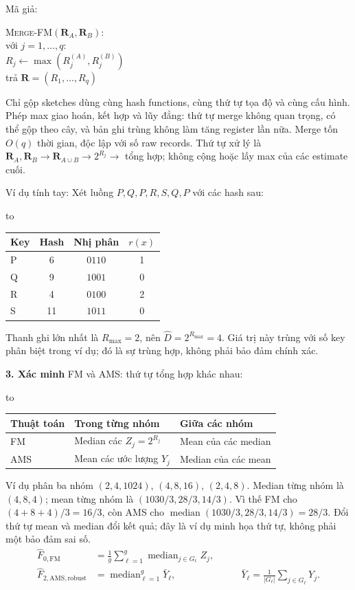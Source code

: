 \documentclass[10pt,a4paper,twocolumn]{article}
\makeatletter
\newcommand{\key}[1]{#1:\enspace}
\newenvironment{examtable}[1]{%
  \par\addvspace{2pt}\noindent\hbox to \linewidth\bgroup\hfil
  \setlength{\tabcolsep}{4pt}%
  \renewcommand{\arraystretch}{1.12}\begin{tabular}{#1}%
}{\end{tabular}\hfil\egroup\par\addvspace{2pt}}
\newcommand{\unitheading}[2]{%
  \par\addvspace{1pt}\noindent\textbf{#1. #2}\enspace}
\newcommand{\unitverification}{\unitheading{3}{Xác minh}}
\newenvironment{algpseudo}{%
  \par\addvspace{2pt}\noindent
  \setlength{\parskip}{0pt}%
  Mã giả:\par\nobreak
  \begin{list}{}{\setlength{\leftmargin}{1em}\setlength{\topsep}{0pt}%
    \setlength{\partopsep}{0pt}\setlength{\parsep}{0pt}%
    \@beginparpenalty=10000\relax}%
  \item\relax
}{\end{list}\par\addvspace{3pt}}
\makeatother
\begin{document}
\begin{algpseudo}
\textsc{Merge-FM}$(\mathbf R_A,\mathbf R_B)$:\\
\quad với $j=1,\ldots,q$:\\
\qquad $R_j\gets\max(R_j^{(A)},R_j^{(B)})$\\
trả $\mathbf R=(R_1,\ldots,R_q)$
\end{algpseudo}
Chỉ gộp sketches dùng cùng hash functions, cùng thứ tự tọa độ và cùng cấu hình. Phép max giao hoán, kết hợp và lũy đẳng: thứ tự merge không quan trọng, có thể gộp theo cây, và bản ghi trùng không làm tăng register lần nữa. Merge tốn $O(q)$ thời gian, độc lập với số raw records. Thứ tự xử lý là $\mathbf R_A,\mathbf R_B\to\mathbf R_{A\cup B}\to 2^{R_j}\to$ tổng hợp; không cộng hoặc lấy max của các estimate cuối.

\key{Ví dụ tính tay} Xét luồng $P,Q,P,R,S,Q,P$ với các hash sau:
\begin{examtable}{@{}l c c c@{}}
\toprule
Key & Hash & Nhị phân & $r(x)$ \\
\midrule
P & 6 & $0110$ & 1 \\
Q & 9 & $1001$ & 0 \\
R & 4 & $0100$ & 2 \\
S & 11 & $1011$ & 0 \\
\bottomrule
\end{examtable}
Thanh ghi lớn nhất là $R_{\max}=2$, nên $\hat D=2^{R_{\max}}=4$. Giá trị này trùng với số key phân biệt trong ví dụ; đó là sự trùng hợp, không phải bảo đảm chính xác.


\unitverification
\key{FM và AMS: thứ tự tổng hợp khác nhau}
\begin{examtable}{@{}l p{}p{}@{}}
\toprule
Thuật toán & Trong từng nhóm & Giữa các nhóm \\
\midrule
FM & Median các $Z_j=2^{R_j}$ & Mean của các median \\
AMS & Mean các ước lượng $Y_j$ & Median của các mean \\
\bottomrule
\end{examtable}
Ví dụ phân ba nhóm $(2,4,1024)$, $(4,8,16)$, $(2,4,8)$. Median từng nhóm là $(4,8,4)$; mean từng nhóm là $(1030/3,28/3,14/3)$. Vì thế FM cho $(4+8+4)/3=16/3$, còn AMS cho $\operatorname{median}(1030/3,28/3,14/3)=28/3$. Đổi thứ tự mean và median đổi kết quả; đây là ví dụ minh họa thứ tự, không phải một bảo đảm sai số.
\[
\begin{aligned}
\widehat F_{0,\mathrm{FM}}&=\frac1g\sum_{\ell=1}^g\operatorname{median}_{j\in G_\ell}Z_j,\\
\widehat F_{2,\mathrm{AMS,robust}}&=\operatorname{median}_{\ell=1}^g\bar Y_\ell,
&\qquad \bar Y_\ell=\frac1{|G_\ell|}\sum_{j\in G_\ell}Y_j.
\end{aligned}
\]
\end{document}
